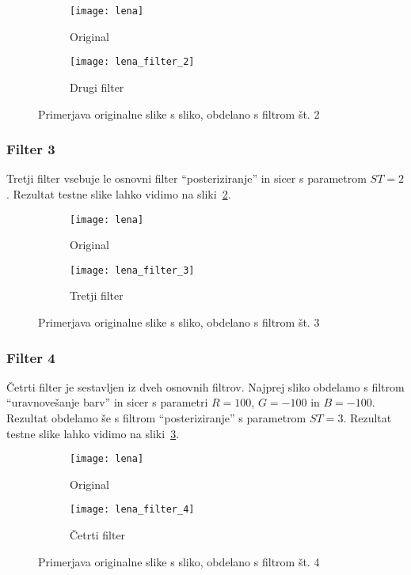 \begin{figure}[!ht]
    \centering
    \begin{subfigure}[b]{0.4\textwidth}
        \texttt{[image: lena]}
        \caption{Original}
    \end{subfigure}
    \begin{subfigure}[b]{0.4\textwidth}
        \texttt{[image: lena\_filter\_2]}
        \caption{Drugi filter}
    \end{subfigure}
    \caption{Primerjava originalne slike s sliko, obdelano s filtrom št. 2}
    \label{fig:lena_filter_2}
\end{figure}


\subsubsection*{Filter 3}
Tretji filter vsebuje le osnovni filter ``posteriziranje'' in sicer s parametrom
$ST = 2$. Rezultat testne slike lahko vidimo na sliki~\ref{fig:lena_filter_3}.

\begin{figure}[!ht]
    \centering
    \begin{subfigure}[b]{0.4\textwidth}
        \texttt{[image: lena]}
        \caption{Original}
    \end{subfigure}
    \begin{subfigure}[b]{0.4\textwidth}
        \texttt{[image: lena\_filter\_3]}
        \caption{Tretji filter}
    \end{subfigure}
    \caption{Primerjava originalne slike s sliko, obdelano s filtrom št. 3}
    \label{fig:lena_filter_3}
\end{figure}


\subsubsection*{Filter 4}
Četrti filter je sestavljen iz dveh osnovnih filtrov. Najprej sliko obdelamo s
filtrom ``uravnovešanje barv'' in sicer s parametri $R = 100$, $G = -100$ in
$B = -100$. Rezultat obdelamo še s filtrom ``posteriziranje'' s parametrom
$ST = 3$. Rezultat testne slike lahko vidimo na sliki~\ref{fig:lena_filter_4}.

\begin{figure}[!ht]
    \centering
    \begin{subfigure}[b]{0.4\textwidth}
        \texttt{[image: lena]}
        \caption{Original}
    \end{subfigure}
    \begin{subfigure}[b]{0.4\textwidth}
        \texttt{[image: lena\_filter\_4]}
        \caption{Četrti filter}
    \end{subfigure}
    \caption{Primerjava originalne slike s sliko, obdelano s filtrom št. 4}
    \label{fig:lena_filter_4}
\end{figure}


